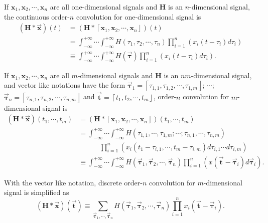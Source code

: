 \documentclass[twoside,11pt]{article}
\def\tvar#1{\mathbf{#1}} %
\def\vsymb#1{\vec{\mathbf{#1}}}
\def\isintinf{\int_{-\infty}^{+\infty}\!\!\!\cdots\!\int_{-\infty}^{+\infty}\!}
\def\lcerfl#1{\left\lceil{#1}\right\rfloor}
\begin{document}
If \(\tvar{x}_1, \tvar{x}_2, \cdots, \tvar{x}_n\) are all one-dimensional signals and \(\tvar{H}\) is an \(n\)-dimensional signal, the continuous order-\(n\) convolution for one-dimensional signal is
\begin{equation}
  \begin{aligned}
    \left(\tvar{H} * \vsymb{x}\right)(t)
     & = \left(\tvar{H} * \lcerfl{\tvar{x}_1, \tvar{x}_2, \cdots, \tvar{x}_n} \right)(t)                     \\
     & = \isintinf H(\tau_1, \tau_2, \cdots, \tau_n) \prod_{i=1}^{n} \left( x_i(t - \tau_i) d \tau_i \right) \\
     & \equiv \isintinf H(\vsymb{\tau}) \prod_{i=1}^{n}\left( x_i(t - \tau_i) d \tau_i \right).
  \end{aligned}
  \label{equ:def-continuous-order-n-convolution-1d}
\end{equation}

If \(\tvar{x}_1, \tvar{x}_2, \cdots, \tvar{x}_n\) are all \(m\)-dimensional signals and \(\tvar{H}\) is an \(nm\)-dimensional signal, and vector like notations have the form \(\vsymb{\tau}_1 = \lcerfl{\tau_{1,1}, \tau_{1,2}, \cdots, \tau_{1,m}}\); \(\cdots\); \(\vsymb{\tau}_n = \lcerfl{\tau_{n,1}, \tau_{n,2}, \cdots, \tau_{n,m}}\) and \(\vsymb{t} = \lcerfl{t_1, t_2, \cdots, t_m}\), order-\(n\) convolution for \(m\)-dimensional signal is
\begin{equation}
  \begin{aligned}
    \left(\tvar{H} * \vsymb{x} \right)(t_1, \cdots, t_m)
     & = \left(\tvar{H} * \lcerfl{\tvar{x}_1, \tvar{x}_2, \cdots, \tvar{x}_n} \right)(t_1, \cdots, t_m) \\
     & = \isintinf H(\tau_{1,1}, \cdots, \tau_{1,m}; \cdots ; \tau_{n,1}, \cdots, \tau_{n,m})           \\
     & \qquad\quad
    \prod_{i=1}^{n} \left(
    x_i(t_1 - \tau_{i,1}, \cdots, t_m - \tau_{i,m}) d \tau_{i,1} \cdots d \tau_{i,m}
    \right)                                                                                             \\
     & \equiv \isintinf H(\vsymb{\tau}_1, \vsymb{\tau}_2, \cdots, \vsymb{\tau}_n)
    \prod_{i=1}^{n} \left(
    x(\vsymb{t} - \vsymb{\tau}_i) d \vsymb{\tau}_i
    \right).
  \end{aligned}
  \label{equ:def-continuous-order-n-convolution-md}
\end{equation}

With the vector like notation, discrete order-\(n\) convolution for \(m\)-dimensional signal is simplified as
\begin{equation}
  \left(\tvar{H} * \vsymb{x}\right)(\vsymb{t})
  \equiv \sum_{\vsymb{\tau}_1, \cdots, \vsymb{\tau}_n} H(\vsymb{\tau}_1, \vsymb{\tau}_2, \cdots, \vsymb{\tau}_n) \prod_{i=1}^{n} x_i(\vsymb{t} - \vsymb{\tau}_i).
  \label{equ:def-discrete-order-n-convolution-md}
\end{equation}
\end{document}
